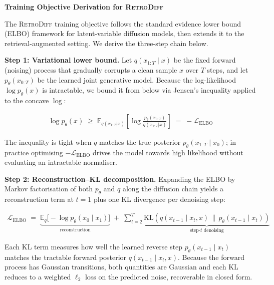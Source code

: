 \documentclass[11pt]{article}
\newcommand{\method}{\textsc{RetroDiff}\xspace}
\newcommand{\Lelbo}{\mathcal{L}_{\mathrm{ELBO}}}
\newcommand{\KL}{\mathrm{KL}}
\newcommand{\ptheta}{p_\theta}
\newcommand{\Eq}[1]{\mathbb{E}_{#1}}
\begin{document}
\begin{center}
  {\large\bfseries Training Objective Derivation for \method}
\end{center}

\vspace{0.5em}

\noindent
The \method training objective follows the standard evidence lower bound (ELBO) framework
for latent-variable diffusion models, then extends it to the retrieval-augmented setting.
We derive the three-step chain below.

\medskip
\noindent\textbf{Step 1: Variational lower bound.}
Let $q(x_{1:T}\mid x)$ be the fixed forward (noising) process that gradually corrupts a
clean sample $x$ over $T$ steps, and let $\ptheta(x_{0:T})$ be the learned joint
generative model.  Because the log-likelihood $\log \ptheta(x)$ is intractable, we bound
it from below via Jensen's inequality applied to the concave $\log$:

\begin{align}
  \log \ptheta(x)
    \;\geq\;
    \Eq{q(x_{1:T}|x)}\!\left[\log\frac{\ptheta(x_{0:T})}{q(x_{1:T}|x)}\right]
    \;=\;
    -\Lelbo
  \label{eq:elbo}
\end{align}

\noindent
The inequality is tight when $q$ matches the true posterior $\ptheta(x_{1:T}\mid x_0)$;
in practice optimising $-\Lelbo$ drives the model towards high likelihood without
evaluating an intractable normaliser.

\medskip
\noindent\textbf{Step 2: Reconstruction--KL decomposition.}
Expanding the ELBO by Markov factorisation of both $\ptheta$ and $q$ along the diffusion
chain yields a reconstruction term at $t\!=\!1$ plus one KL divergence per denoising step:

\begin{align}
  \Lelbo
  \;=\;
  \underbrace{\Eq{q}\bigl[-\log \ptheta(x_0\mid x_1)\bigr]}_{\text{reconstruction}}
  \;+\;
  \sum_{t=2}^{T}
    \underbrace{\KL\!\left(q(x_{t-1}\mid x_t, x)
               \,\big\|\,
               \ptheta(x_{t-1}\mid x_t)\right)}_{\text{step-}t\text{ denoising}}
  \label{eq:decomp}
\end{align}

\noindent
Each KL term measures how well the learned reverse step $\ptheta(x_{t-1}\mid x_t)$ matches
the tractable forward posterior $q(x_{t-1}\mid x_t, x)$.  Because the forward process has
Gaussian transitions, both quantities are Gaussian and each KL reduces to a weighted
$\ell_2$ loss on the predicted noise, recoverable in closed form.
\end{document}
